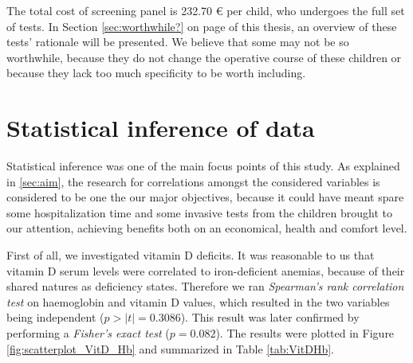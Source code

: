 
The total cost of screening panel is 232.70 € per child, who undergoes the full set of tests. In Section \ref{sec:worthwhile?} on page \pageref{sec:worthwhile?} of this thesis, an overview of these tests' rationale will be presented. We believe that some may not be so worthwhile, because they do not change the operative course of these children or because they lack too much specificity to be worth including.

\section{Statistical inference of data}\label{sec:statisticalinference}
Statistical inference was one of the main focus points of this study. As explained in \ref{sec:aim}, the research for correlations amongst the considered variables is considered to be one the our major objectives, because it could have meant spare some hospitalization time and some invasive tests from the children brought to our attention, achieving benefits both on an economical, health and comfort level.

First of all, we investigated vitamin D deficits. It was reasonable to us that vitamin D serum levels were correlated to iron-deficient anemias, because of their shared natures as deficiency states. Therefore we ran \textit{Spearman's rank correlation test} on haemoglobin and vitamin D values, which resulted in the two variables being independent ($p>|t|=0.3086$). This result was later confirmed by performing a \textit{Fisher's exact test} ($p=0.082$). The results were plotted in Figure \ref{fig:scatterplot_VitD_Hb} and summarized in Table \ref{tab:VitDHb}.

